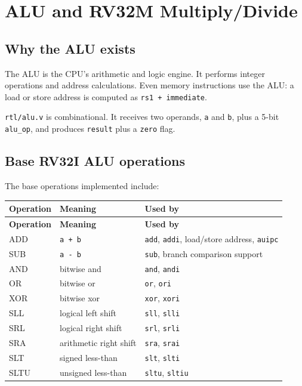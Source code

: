 \section{ALU and RV32M Multiply/Divide}

\subsection{Why the ALU exists}

The ALU is the CPU’s arithmetic and logic engine. It performs integer operations and address calculations. Even memory instructions use the ALU: a load or store address is computed as \texttt{rs1 + immediate}.

\texttt{rtl/alu.v} is combinational. It receives two operands, \texttt{a} and \texttt{b}, plus a 5-bit \texttt{alu\_op}, and produces \texttt{result} plus a \texttt{zero} flag.

\subsection{Base RV32I ALU operations}

The base operations implemented include:

\begin{longtable}{|>{\RaggedRight\arraybackslash}p{}|>{\RaggedRight\arraybackslash}p{}|>{\RaggedRight\arraybackslash}p{}|}
\hline
\textbf{Operation} & \textbf{Meaning} & \textbf{Used by} \\
\hline
\endfirsthead
\hline
\textbf{Operation} & \textbf{Meaning} & \textbf{Used by} \\
\hline
\endhead
ADD & \texttt{a + b} & \texttt{add}, \texttt{addi}, load/store address, \texttt{auipc} \\
\hline
SUB & \texttt{a - b} & \texttt{sub}, branch comparison support \\
\hline
AND & bitwise and & \texttt{and}, \texttt{andi} \\
\hline
OR & bitwise or & \texttt{or}, \texttt{ori} \\
\hline
XOR & bitwise xor & \texttt{xor}, \texttt{xori} \\
\hline
SLL & logical left shift & \texttt{sll}, \texttt{slli} \\
\hline
SRL & logical right shift & \texttt{srl}, \texttt{srli} \\
\hline
SRA & arithmetic right shift & \texttt{sra}, \texttt{srai} \\
\hline
SLT & signed less-than & \texttt{slt}, \texttt{slti} \\
\hline
SLTU & unsigned less-than & \texttt{sltu}, \texttt{sltiu} \\
\hline
\end{longtable}

